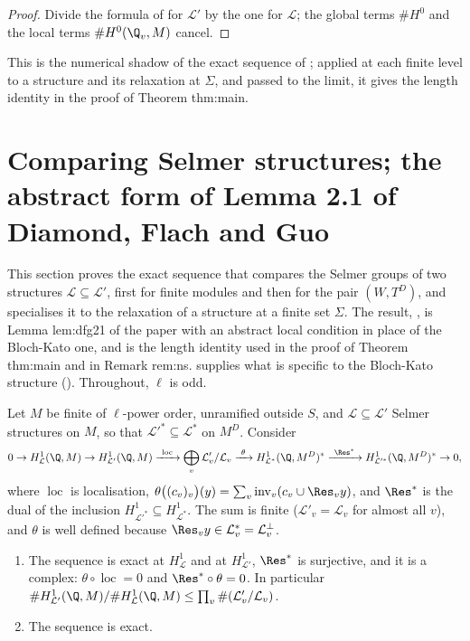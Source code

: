 \begin{proof}
Divide the formula of  for $\mathcal L'$ by the one for $\mathcal L$; the global terms $\#H^0$ and the local terms $\#H^0(\Q_v,M)$ cancel.
\end{proof}

\noindent This is the numerical shadow of the exact sequence of ; applied at each finite level to a structure and its relaxation at $\Sigma$,
and passed to the limit, it gives the length identity in the proof of Theorem thm:main.
\section[Comparing Selmer structures]{Comparing Selmer structures; the abstract form of Lemma 2.1 of Diamond, Flach and Guo}\label{sec:galcoh:comparison}

This section proves the exact sequence that compares the Selmer groups of two structures $\mathcal L\subseteq\mathcal L'$, first for finite modules and then for the pair
$(W,T^D)$, and specialises it to the relaxation of a structure at a finite set $\Sigma$. The result, , is Lemma lem:dfg21 of the paper
with an abstract local condition in place of the Bloch-Kato one, and  is the length identity used in the proof of Theorem thm:main and
in Remark rem:ns.  supplies what is specific to the Bloch-Kato structure (). Throughout, $\ell$ is odd.

\begin{theorem}\label{thm:galcoh:comparison}
Let $M$ be finite of $\ell$-power order, unramified outside $S$, and $\mathcal L\subseteq\mathcal L'$ Selmer structures on $M$, so that $\mathcal L'^*\subseteq\mathcal L^*$ on $M^D$. Consider
\[
0\to H^1_{\mathcal L}(\Q,M)\to H^1_{\mathcal L'}(\Q,M)\xrightarrow{\ \operatorname{loc}\ }\bigoplus_v\mathcal L'_v/\mathcal L_v\xrightarrow{\ \theta\ }H^1_{\mathcal L^*}(\Q,M^D)^*\xrightarrow{\ \Res^*\ }H^1_{\mathcal L'^*}(\Q,M^D)^*\to0,
\]
where $\operatorname{loc}$ is localisation, $\theta\bigl((c_v)_v\bigr)(y)=\sum_v\operatorname{inv}_v(c_v\cup\Res_vy)$, and $\Res^*$ is the dual of the inclusion
$H^1_{\mathcal L'^*}\subseteq H^1_{\mathcal L^*}$. The sum is finite ($\mathcal L'_v=\mathcal L_v$ for almost all $v$), and $\theta$ is well defined because $\Res_vy\in\mathcal L^*_v=\mathcal L_v^\perp$.
\begin{enumerate}[label=(\roman*)]
\item The sequence is exact at $H^1_{\mathcal L}$ and at $H^1_{\mathcal L'}$, $\Res^*$ is surjective, and it is a complex: $\theta\circ\operatorname{loc}=0$ and $\Res^*\circ\theta=0$. In
particular $\#H^1_{\mathcal L'}(\Q,M)/\#H^1_{\mathcal L}(\Q,M)\le\prod_v\#(\mathcal L'_v/\mathcal L_v)$.
\item The sequence is exact.
\end{enumerate}
\end{theorem}

